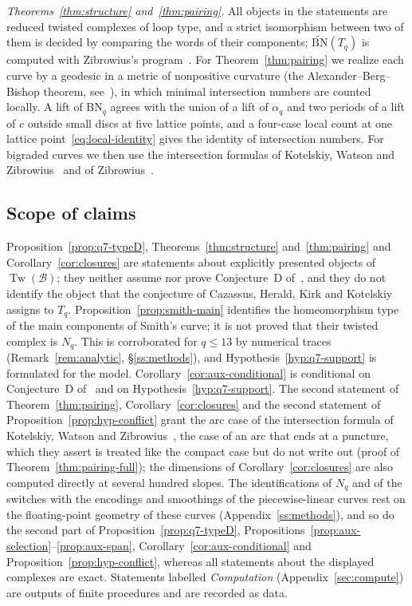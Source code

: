 \emph{Theorems~\ref{thm:structure} and~\ref{thm:pairing}.} All objects in the statements are reduced
twisted complexes of loop type, and a strict isomorphism between two of them is decided by comparing
the words of their components; $\widetilde{\mathrm{BN}}(T_q)$ is computed with Zibrowius's
program~\cite{Zibkht}. For Theorem~\ref{thm:pairing} we realize each curve by a geodesic in a metric of
nonpositive curvature (the Alexander--Berg--Bishop theorem, see~\cite[Thm.~7.28]{AKP}), in which minimal
intersection numbers are counted locally. A lift of $\mathrm{BN}_q$ agrees with the union of a lift of
$\alpha_q$ and two periods of a lift of $c$ outside small discs at five lattice points, and a four-case
local count at one lattice point~\eqref{eq:local-identity} gives the identity of intersection numbers. For
bigraded curves we then use the intersection formulas of Kotelskiy, Watson and
Zibrowius~\cite[Thm.~5.25]{KWZ} and of Zibrowius~\cite[Thm.~4.45]{Zibrowius}.

\subsection{Scope of claims}
Proposition~\ref{prop:q7-typeD}, Theorems~\ref{thm:structure} and~\ref{thm:pairing} and
Corollary~\ref{cor:closures} are statements about explicitly presented objects of
$\operatorname{Tw}(\mathcal B)$; they neither assume nor prove Conjecture~D of~\cite{CHKK}, and
they do not identify the object that the conjecture of Cazassus, Herald, Kirk and Kotelskiy assigns to $T_q$.
Proposition~\ref{prop:smith-main} identifies the homeomorphism type of the main components of Smith's curve;
it is not proved that their twisted complex is $N_q$. This is corroborated for $q\le13$ by numerical traces
(Remark~\ref{rem:analytic}, \S\ref{ss:methods}), and Hypothesis~\ref{hyp:q7-support} is formulated for the
model. Corollary~\ref{cor:aux-conditional} is conditional on Conjecture~D of~\cite{CHKK} and on
Hypothesis~\ref{hyp:q7-support}. The second statement of Theorem~\ref{thm:pairing}, Corollary~\ref{cor:closures} and the second statement of Proposition~\ref{prop:hyp-conflict} grant the arc case of the intersection formula of Kotelskiy, Watson and
Zibrowius~\cite[Thm.~5.25]{KWZ}, the case of an arc that ends at a puncture, which they assert is treated
like the compact case but do not write out (proof of Theorem~\ref{thm:pairing-full}); the dimensions of
Corollary~\ref{cor:closures} are also computed directly at several hundred slopes. The identifications of $N_q$ and of the switches with the encodings and smoothings of the piecewise-linear curves
rest on the floating-point geometry of these curves (Appendix~\ref{ss:methods}), and so do the second part of
Proposition~\ref{prop:q7-typeD}, Propositions~\ref{prop:aux-selection}--\ref{prop:aux-span},
Corollary~\ref{cor:aux-conditional} and Proposition~\ref{prop:hyp-conflict}, whereas all statements about
the displayed complexes are exact. Statements labelled \emph{Computation} (Appendix~\ref{sec:compute}) are outputs of
finite procedures and are recorded as data.

